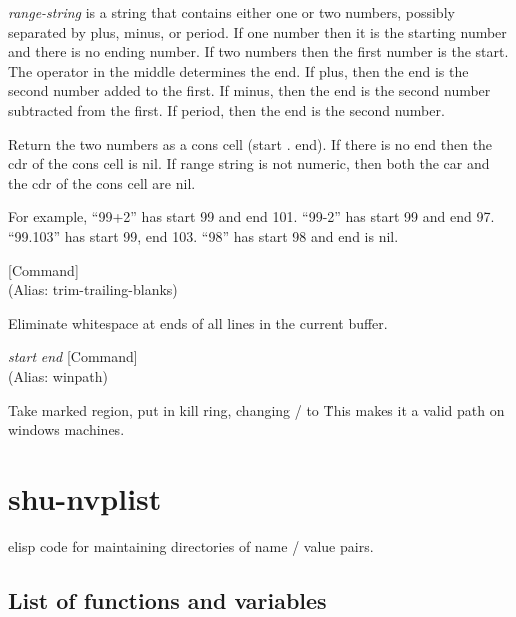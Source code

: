 \begin{doc-string}
\emph{range-string} is a string that contains either one or two numbers, possibly
separated by plus, minus, or period.  If one number then it is the starting number
and there is no ending number.  If two numbers then the first number is the start.
The operator in the middle determines the end.  If plus, then the end is the
second number added to the first.  If minus, then the end is the second number
subtracted from the first.  If period, then the end is the second number.

Return the two numbers as a cons cell (start . end).  If there is no end then the
cdr of the cons cell is nil.  If range string is not numeric, then both the car
and the cdr of the cons cell are nil.

For example, ``99+2'' has start 99 and end 101.  ``99-2'' has start 99 and end 97.
``99.103'' has start 99, end 103.  ``98'' has start 98 and end is nil.
\end{doc-string}

\vspace{1em}
\noindent
{}
\usebox{\funcname}
 \hfill [Command]\\%
 (Alias: trim-trailing-blanks)

\begin{doc-string}
Eliminate whitespace at ends of all lines in the current buffer.
\end{doc-string}

\vspace{1em}
\noindent
{}
\usebox{\funcname}\emph{start} \emph{end}
 \hfill [Command]\\%
 (Alias: winpath)

\begin{doc-string}
Take marked region, put in kill ring, changing / to \.
This makes it a valid path on windows machines.
\end{doc-string}

\eject
\section{shu-nvplist}


elisp code for maintaining directories of name / value pairs.


\subsection{List of functions and variables}

